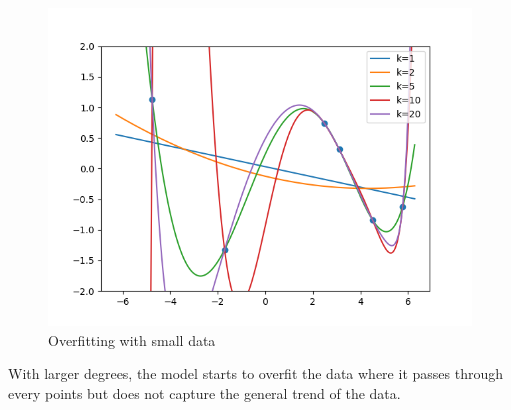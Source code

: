 \begin{answer}
    \begin{figure}[H]
        \includegraphics[width=\textwidth]{../src/featuremaps/small.png}
        \caption{Overfitting with small data}
    \end{figure}
    With larger degrees, the model starts to overfit the data where it passes
    through every points but does not capture the general trend of the data.
\end{answer}
